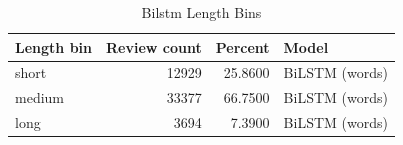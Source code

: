 \begin{table}
\caption{Bilstm Length Bins}
\label{tab:bilstm_length_bins}
\begin{tabular}{lrrl}
\toprule
Length bin & Review count & Percent & Model \\
\midrule
short & 12929 & 25.8600 & BiLSTM (words) \\
medium & 33377 & 66.7500 & BiLSTM (words) \\
long & 3694 & 7.3900 & BiLSTM (words) \\
\bottomrule
\end{tabular}
\end{table}
